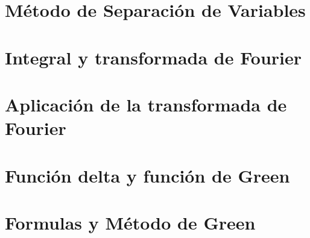 \documentclass[oneside]{book}
\begin{document}
\chapter{Método de Separación de Variables}

\chapter{Integral y transformada de Fourier}

\chapter{Aplicación de la transformada de Fourier}

\chapter{Función delta y función de Green}

\chapter{Formulas y Método de Green}

\end{document}
